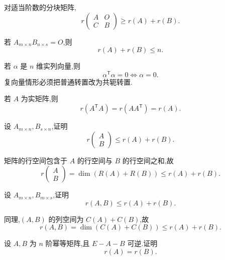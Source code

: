 \begin{proposition}[\marktwostar]
对适当阶数的分块矩阵,
\[
 r\begin{pmatrix}A&O\\C&B\end{pmatrix}\geq r(A)+r(B).
\]
\end{proposition}

\begin{proposition}[\markstar]
若 $A_{m\times n}B_{n\times s}=O$,则
\[
 r(A)+r(B)\leq n.
\]
\end{proposition}

\begin{lemma}[\marktwostar]
若 $\alpha$ 是 $n$ 维实列向量,则
\[
 \alpha^{\mathsf T}\alpha=0\iff \alpha=0.
\]
复向量情形必须把普通转置改为共轭转置.
\end{lemma}

\begin{proposition}[\marktwostar]
若 $A$ 为实矩阵,则
\[
 r(A^{\mathsf T}A)=r(AA^{\mathsf T})=r(A).
\]
\end{proposition}

\begin{example}
设 $A_{m\times n},B_{s\times n}$,证明
\[
 r\begin{pmatrix}A\\B\end{pmatrix}\leq r(A)+r(B).
\]
\end{example}
\exampleblank

\begin{solution}
矩阵的行空间包含于 $A$ 的行空间与 $B$ 的行空间之和,故
\[
 r\begin{pmatrix}A\\B\end{pmatrix}
 =\dim(R(A)+R(B))
 \leq r(A)+r(B).
\]
\end{solution}

\begin{example}
设 $A_{m\times n},B_{m\times s}$,证明
\[
 r(A,B)\leq r(A)+r(B).
\]
\end{example}
\exampleblank

\begin{solution}
同理,$(A,B)$ 的列空间为 $C(A)+C(B)$,故
\[
 r(A,B)=\dim(C(A)+C(B))\leq r(A)+r(B).
\]
\end{solution}

\begin{example}
设 $A,B$ 为 $n$ 阶幂等矩阵,且 $E-A-B$ 可逆.证明
\[
 r(A)=r(B).
\]
\end{example}
\exampleblank

